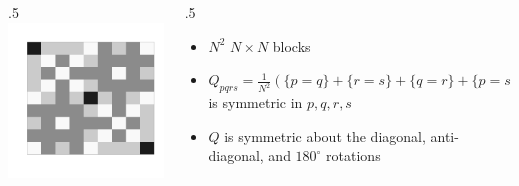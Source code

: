\documentclass{beamer}
\newcommand{\I}{N}
\newcommand{\Q}{Q}
\begin{document}
\begin{frame}
  \begin{columns}
    \begin{column}{.5\textwidth}
      \includegraphics[width=\textwidth]{fig6.png}
    \end{column}
    \begin{column}{.5\textwidth}
      \begin{itemize}
      \item $\I^2$ $\I\times\I$ blocks
      \item $Q_{pqrs}=\frac{1}{\I^2}(\{p=q\}+\{r=s\}+\{q=r\}+\{p=s\}+\{s=q\}+\{p=r\})-\frac{1}{2\I}(\{p=q=r\}+\{p=q=s\}+\{p=r=s\}+\{q=r=s\})-\frac{4}{\I^3}$ is symmetric in $p,q,r,s$
      \item $\Q$ is symmetric about the diagonal, anti-diagonal, and
        $180^\circ$ rotations
      \end{itemize}
    \end{column}
  \end{columns}
\end{frame}
\end{document}
